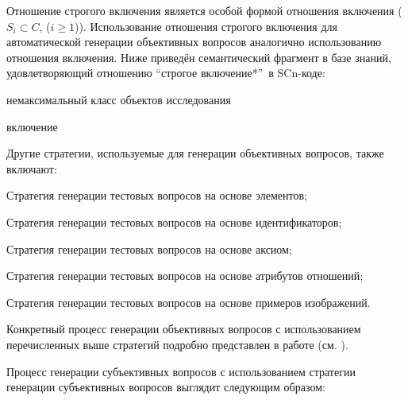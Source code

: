 \begin{textitemize}
\begin{textitemize}
		Отношение строгого включения является особой формой отношения включения ($S_{i}\subset  C $, ($i\ge 1$)). Использование отношения строгого включения для автоматической генерации объективных вопросов аналогично использованию отношения включения. Ниже приведён семантический фрагмент в базе знаний, удовлетворяющий отношению ``строгое включение*''\ в SCn-коде:
		
		
		\begin{scnhaselementrolelist}{немаксимальный класс объектов исследования}
			\begin{scnrelfromlist}{включение} 
			\end{scnrelfromlist}
		\end{scnhaselementrolelist}
		
	\end{textitemize}
	
\end{textitemize}	

Другие стратегии, используемые для генерации объективных вопросов, также включают:
\begin{textitemize}
	\item Стратегия генерации тестовых вопросов на основе элементов;
	\item Стратегия генерации тестовых вопросов на основе идентификаторов;
	\item Стратегия генерации тестовых вопросов на основе аксиом; 
	\item Стратегия генерации тестовых вопросов на основе атрибутов отношений;
	\item Стратегия генерации тестовых вопросов на основе примеров изображений.
\end{textitemize}

Конкретный процесс генерации объективных вопросов с использованием перечисленных выше стратегий подробно представлен в работе (см. ).

Процесс генерации субъективных вопросов с использованием стратегии генерации субъективных вопросов выглядит следующим образом:

